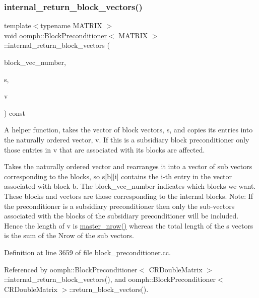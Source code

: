 \subsubsection{\texorpdfstring{internal\+\_\+return\+\_\+block\+\_\+vectors()}{internal\_return\_block\_vectors()}\hspace{0.1cm}{\footnotesize\ttfamily [1/2]}}
{\footnotesize\ttfamily template$<$typename M\+A\+T\+R\+IX $>$ \\
void \hyperlink{classoomph_1_1BlockPreconditioner}{oomph\+::\+Block\+Preconditioner}$<$ M\+A\+T\+R\+IX $>$\+::internal\+\_\+return\+\_\+block\+\_\+vectors (\begin{DoxyParamCaption}\item[{const \hyperlink{classoomph_1_1Vector}{Vector}$<$ unsigned $>$ \&}]{block\+\_\+vec\+\_\+number,  }\item[{const \hyperlink{classoomph_1_1Vector}{Vector}$<$ \hyperlink{classoomph_1_1DoubleVector}{Double\+Vector} $>$ \&}]{s,  }\item[{\hyperlink{classoomph_1_1DoubleVector}{Double\+Vector} \&}]{v }\end{DoxyParamCaption}) const}



A helper function, takes the vector of block vectors, s, and copies its entries into the naturally ordered vector, v. If this is a subsidiary block preconditioner only those entries in v that are associated with its blocks are affected. 

Takes the naturally ordered vector and rearranges it into a vector of sub vectors corresponding to the blocks, so s\mbox{[}b\mbox{]}\mbox{[}i\mbox{]} contains the i-\/th entry in the vector associated with block b. The block\+\_\+vec\+\_\+number indicates which blocks we want. These blocks and vectors are those corresponding to the internal blocks. Note\+: If the preconditioner is a subsidiary preconditioner then only the sub-\/vectors associated with the blocks of the subsidiary preconditioner will be included. Hence the length of v is \hyperlink{classoomph_1_1BlockPreconditioner_a3e5b553f65e6c25354a5c908d507e8ee}{master\+\_\+nrow()} whereas the total length of the s vectors is the sum of the Nrow of the sub vectors. 

Definition at line 3659 of file block\+\_\+preconditioner.\+cc.



Referenced by oomph\+::\+Block\+Preconditioner$<$ C\+R\+Double\+Matrix $>$\+::internal\+\_\+return\+\_\+block\+\_\+vectors(), and oomph\+::\+Block\+Preconditioner$<$ C\+R\+Double\+Matrix $>$\+::return\+\_\+block\+\_\+vectors().

